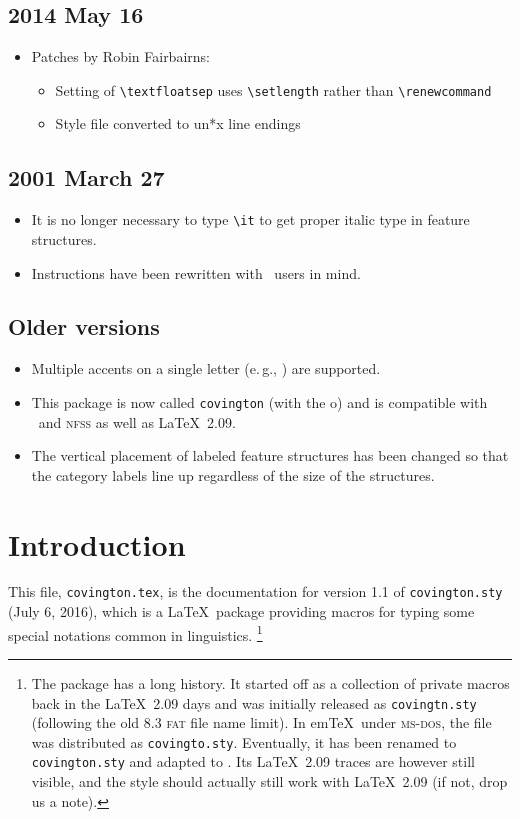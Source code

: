 \documentclass[english]{article}
\newcommand*\jfmacro[1]{\texttt{#1}}
\newcommand*\jfcsmacro[1]{\jfmacro{\textbackslash{#1}}}
\def\pversion{Version 1.1}
\def\pdate{July 6, 2016}
\begin{document}
\subsection*{2014 May 16}

\begin{itemize}
	\item Patches by Robin Fairbairns:
	\begin{itemize}
	    \item Setting of \jfcsmacro{textfloatsep} uses \jfcsmacro{setlength} rather than \jfcsmacro{renewcommand}
	    \item Style file converted to un*x line endings
    \end{itemize}
\end{itemize}

\subsection*{2001 March 27}

\begin{itemize}
\item It is no longer necessary to type \jfcsmacro{it} to get proper italic type in feature structures.
\item Instructions have been rewritten with \LaTeXe\ users in mind.
\end{itemize}

\subsection*{Older versions}

\begin{itemize}
\item Multiple accents on a single letter (e.\,g., \emph{}) are supported.
\item This package is now called \texttt{covington} (with the o)
and is compatible with \LaTeXe\ and \textsc{nfss} as well as \LaTeX\ 2.09.
\item The vertical placement of labeled feature structures has 
been changed
so that the category labels line up regardless of the size of
the structures.
\end{itemize}


\section*{Introduction}

This file, \texttt{covington.tex}, is the documentation for \MakeLowercase{\pversion}
of \texttt{covington.sty} (\pdate), which is a \LaTeX\ package providing macros
for typing some special notations common in linguistics.%
\footnote{The package has a long history. It started off as a collection of private macros back in the \LaTeX\ 2.09 days and was initially released as \texttt{covingtn.sty} (following the old 8.3 \textsc{fat} file name limit). In em\TeX\ under \textsc{ms-dos}, the file was distributed as \texttt{covingto.sty}. Eventually, it has been renamed to \texttt{covington.sty} and adapted to \LaTeXe. Its \LaTeX\ 2.09 traces are however still visible, and the style should actually still work with \LaTeX\ 2.09 (if not, drop us a note).}
\end{document}
